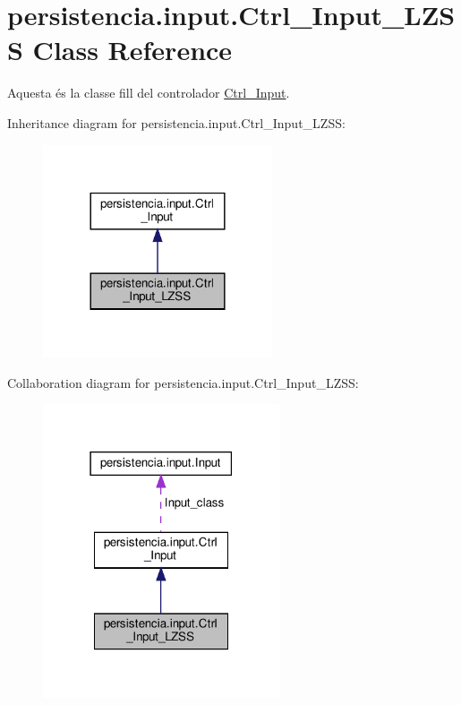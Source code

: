 \hypertarget{classpersistencia_1_1input_1_1Ctrl__Input__LZSS}{}\section{persistencia.\+input.\+Ctrl\+\_\+\+Input\+\_\+\+L\+Z\+SS Class Reference}
\label{classpersistencia_1_1input_1_1Ctrl__Input__LZSS}


Aquesta és la classe fill del controlador \hyperlink{classpersistencia_1_1input_1_1Ctrl__Input}{Ctrl\+\_\+\+Input}.  




Inheritance diagram for persistencia.\+input.\+Ctrl\+\_\+\+Input\+\_\+\+L\+Z\+SS\+:
\nopagebreak
\begin{figure}[H]
\begin{center}
\leavevmode
\includegraphics[width=192pt]{classpersistencia_1_1input_1_1Ctrl__Input__LZSS__inherit__graph}
\end{center}
\end{figure}


Collaboration diagram for persistencia.\+input.\+Ctrl\+\_\+\+Input\+\_\+\+L\+Z\+SS\+:
\nopagebreak
\begin{figure}[H]
\begin{center}
\leavevmode
\includegraphics[width=198pt]{classpersistencia_1_1input_1_1Ctrl__Input__LZSS__coll__graph}
\end{center}
\end{figure}
